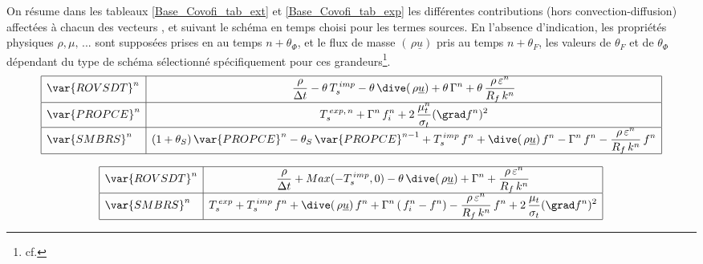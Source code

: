 On résume dans les tableaux \ref{Base_Covofi_tab_ext} et \ref{Base_Covofi_tab_exp} les différentes
contributions (hors convection-diffusion) affectées à chacun des vecteurs
,  et  suivant le schéma en temps choisi pour
les termes sources. En l'absence d'indication, les propriétés physiques
$\rho,\mu,\,...$ sont supposées prises en  au temps $n+\theta_\Phi$, et le flux
de masse $(\,\rho \underline{u})$ pris au temps $n+\theta_F$, les valeurs de
$\theta_F$ et de $\theta_\Phi$ dépendant du type de schéma sélectionné
spécifiquement pour ces grandeurs\footnote{cf. }.
\\

\begin{equation}\label{Base_Covofi_tab_ext}
\begin{array}{|l|c|}
\hline
\var{ROVSDT}^{n} &
\displaystyle
\frac{\rho}{\Delta t}-\theta\,T_s^{\,imp}- \theta\,\dive(\,\rho \underline{u}) +
\theta\,\Gamma^{n}+\theta\,\frac{\rho\,\varepsilon^{n}}{R_f\,k^{n}} \\
\hline
\var{PROPCE}^{n} &
\displaystyle
T_s^{\,exp,\,n} + \Gamma^{n}\,f_i^{n} + 2\, \frac{\mu_t^{n}}{\sigma_t}(\grad f^{n})^2\\
\hline
\var{SMBRS}^{n} &
\displaystyle
(1+\theta_S)\,\var{PROPCE}^{n}-\theta_S\,\var{PROPCE}^{n-1}+ T_s^{\,imp}\,f^{n}
+\dive(\,\rho \underline{u})\,f^{n}-\Gamma^{n}\,f^{n} -
\frac{\rho\,\varepsilon^{n}}{R_f\,k^{n}}\,f^{n}\\
\hline
\end{array}
\end{equation}

\begin{equation}\label{Base_Covofi_tab_exp}
\begin{array} {|l|c|}
\hline
\var{ROVSDT}^{n} &
\displaystyle
\frac{\rho}{\Delta t} + Max(-T_s^{\,imp},0) - \theta\,\dive(\,\rho
\underline{u}) + \Gamma^{n} + \frac{\rho\,\varepsilon^{n}}{R_f\,k^{n}} \\
\hline
\var{SMBRS}^{n} &
\displaystyle
T_s^{\,exp} + T_s^{\,imp}\,f^{n}+\dive(\,\rho
\underline{u})\,f^{n}+\Gamma^{n}\,(\,f_i^{n}-f^{n}) -
\frac{\rho\,\varepsilon^{n}}{R_f\,k^{n}}\,f^{n} + 2\,
\frac{\mu_t}{\sigma_t}(\grad f^{n})^2 \\
\hline
\end{array}
\end{equation}
